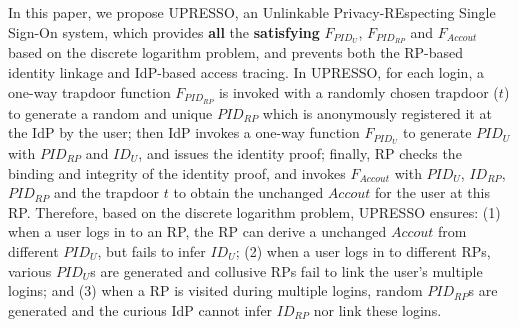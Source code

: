 In this paper, we propose UPRESSO, an Unlinkable Privacy-REspecting Single Sign-On system,
which provides \textbf{all} the \textbf{satisfying} $F_{PID_{U}}$, $F_{PID_{RP}}$ and $F_{Accout}$ based on the discrete logarithm problem, and prevents both the RP-based identity linkage and IdP-based access tracing.
In UPRESSO, for each login,   a one-way trapdoor function $F_{PID_{RP}}$ is invoked with a randomly chosen trapdoor ($t$) to generate a random and unique $PID_{RP}$ which is anonymously registered it at the IdP by the user;
then IdP invokes a one-way function  $F_{PID_{U}}$ to generate $PID_U$ with $PID_{RP}$ and $ID_U$, and issues the identity proof;
finally, RP checks the binding and integrity of the identity proof, and invokes $F_{Accout}$ with $PID_U$, $ID_{RP}$, $PID_{RP}$ and the trapdoor $t$ to obtain the unchanged $Accout$ for the user at this RP.
Therefore, based on the discrete logarithm problem,
 UPRESSO ensures:
 (1) when a  user logs in to an RP, the RP can derive a unchanged $Accout$ from different $PID_U$, but fails to infer $ID_U$;
 (2) when a user logs in to different RPs, various $PID_U$s are generated and collusive RPs fail to link the user's multiple logins;
 and (3) when a RP is visited during multiple logins, random $PID_{RP}$s are generated and the curious IdP cannot infer $ID_{RP}$ nor link these logins.






